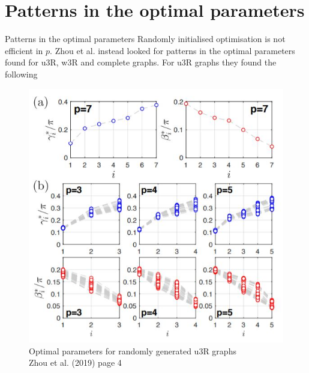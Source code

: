 \documentclass{beamer}
\begin{document}
\section{Patterns in the optimal parameters}
\begin{frame}{Patterns in the optimal parameters}
	Randomly initialised optimisation is not efficient in $p$. Zhou et al. instead looked for patterns in the optimal parameters found for u3R, w3R and complete graphs. For u3R graphs they found the following
	\begin{figure}
		\includegraphics[scale=0.45]{figures/patterns-u3R.jpg}
		\caption{Optimal parameters for randomly generated u3R graphs\\ Zhou et al. (2019) page 4}
	\end{figure}
\end{frame}
\end{document}
